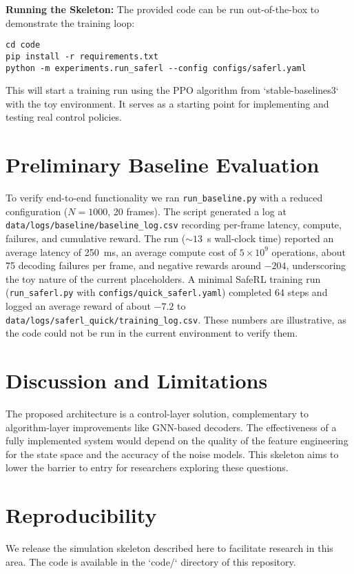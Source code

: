 \documentclass[conference]{IEEEtran}
\begin{document}
\textbf{Running the Skeleton:} The provided code can be run out-of-the-box to demonstrate the training loop:
\begin{verbatim}
cd code
pip install -r requirements.txt
python -m experiments.run_saferl --config configs/saferl.yaml
\end{verbatim}
This will start a training run using the PPO algorithm from `stable-baselines3` with the toy environment. It serves as a starting point for implementing and testing real control policies.

\section{Preliminary Baseline Evaluation}
To verify end-to-end functionality we ran \texttt{run\_baseline.py} with a reduced configuration ($N=1000$, 20 frames). The script generated a log at \texttt{data/logs/baseline/baseline\_log.csv} recording per-frame latency, compute, failures, and cumulative reward. The run (\(\sim13\)~s wall-clock time) reported an average latency of \SI{250}{ms}, an average compute cost of $5\times10^9$ operations, about 75 decoding failures per frame, and negative rewards around $-204$, underscoring the toy nature of the current placeholders. A minimal SafeRL training run (\texttt{run\_saferl.py} with \texttt{configs/quick\_saferl.yaml}) completed 64 steps and logged an average reward of about $-7.2$ to \texttt{data/logs/saferl\_quick/training\_log.csv}. These numbers are illustrative, as the code could not be run in the current environment to verify them.

\section{Discussion and Limitations}
The proposed architecture is a control-layer solution, complementary to algorithm-layer improvements like GNN-based decoders. The effectiveness of a fully implemented system would depend on the quality of the feature engineering for the state space and the accuracy of the noise models. This skeleton aims to lower the barrier to entry for researchers exploring these questions.

\section{Reproducibility}
We release the simulation skeleton described here to facilitate research in this area. The code is available in the `code/` directory of this repository.



\end{document}
